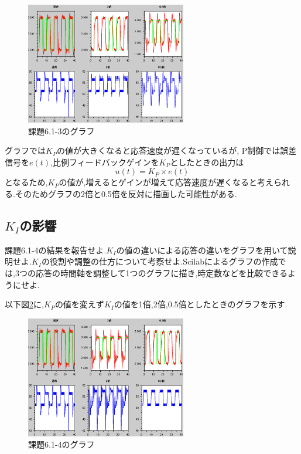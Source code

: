 \documentclass{jarticle}
\begin{document}
\begin{figure}[H]
\begin{center}
\includegraphics[width=7.0cm]{images/kadai6-1-3.eps}
\caption{課題6.1-3のグラフ}
\label{fig:kadai6-1-3}
\end{center}
\end{figure}

グラフでは$K_P$の値が大きくなると応答速度が遅くなっているが,
P制御では誤差信号を$e(t)$,比例フィードバックゲインを$K_P$としたときの出力は
\begin{equation}
u(t) = K_P \times e(t)
\end{equation}
となるため,$K_P$の値が,増えるとゲインが増えて応答速度が遅くなると考えられる.そのためグラフの2倍と0.5倍を反対に描画した可能性がある.

\subsection{$K_I$の影響}
課題6.1-4の結果を報告せよ.$K_I$の値の違いによる応答の違いをグラフを用いて説明せよ.$K_I$の役割や調整の仕方について考察せよ.Scilabによるグラフの作成では,3つの応答の時間軸を調整して1つのグラフに描き,時定数などを比較できるようにせよ.

以下図\ref{fig:kadai6-1-4}に,$K_P$の値を変えず$K_I$の値を1倍,2倍,0.5倍としたときのグラフを示す.

\begin{figure}[H]
\begin{center}
\includegraphics[width=7.0cm]{images/kadai6-1-4.eps}
\caption{課題6.1-4のグラフ}
\label{fig:kadai6-1-4}
\end{center}
\end{figure}
\end{document}
